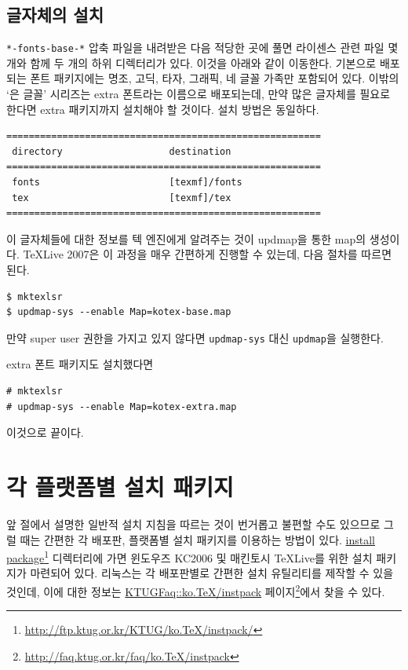 \subsection{글자체의 설치}

\texttt{*-fonts-base-*} 압축 파일을 내려받은 다음 적당한 곳에 풀면
라이센스 관련 파일 몇 개와 함께 두 개의 하위 디렉터리가 있다. 이것을
아래와 같이 이동한다.
기본으로 배포되는 폰트 패키지에는 명조, 고딕, 타자, 그래픽, 네 글꼴 가족만
포함되어 있다. 이밖의 `은 글꼴' 시리즈는 extra 폰트라는 이름으로 배포되는데,
만약 많은 글자체를 필요로 한다면 extra 패키지까지 설치해야 할 것이다.
설치 방법은 동일하다. 
\begin{verbatim}
========================================================
 directory                   destination
========================================================
 fonts                       [texmf]/fonts
 tex                         [texmf]/tex
========================================================
\end{verbatim}

이 글자체들에 대한 정보를 텍 엔진에게 알려주는 것이 updmap을 통한
map의 생성이다. \TeX{}Live 2007은 이 과정을 매우 간편하게 진행할
수 있는데, 다음 절차를 따르면 된다.
\begin{verbatim}
$ mktexlsr
$ updmap-sys --enable Map=kotex-base.map
\end{verbatim}
만약 super user 권한을 가지고 있지 않다면 \texttt{updmap-sys} 대신
\texttt{updmap}을 실행한다. 

extra 폰트 패키지도 설치했다면
\begin{verbatim}
# mktexlsr
# updmap-sys --enable Map=kotex-extra.map
\end{verbatim}
이것으로 끝이다.

\section{각 플랫폼별 설치 패키지}

앞 절에서 설명한 일반적 설치 지침을 따르는 것이 번거롭고 불편할 수도 
있으므로 그럴 때는 간편한 각 배포판, 플랫폼별 설치 패키지를 이용하는
방법이 있다. \href{http://ftp.ktug.or.kr/KTUG/ko.TeX/instpack/}{install
package}\footnote{\url{http://ftp.ktug.or.kr/KTUG/ko.TeX/instpack/}} 디렉터리에 가면 윈도우즈 KC2006 및 매킨토시 \TeX{}Live를 위한
설치 패키지가 마련되어 있다. 리눅스는 각 배포판별로 간편한 설치
유틸리티를 제작할 수 있을 것인데, 이에 대한 정보는 \href{http://faq.ktug.or.kr/faq/ko.TeX/instpack}{KTUGFaq::ko.TeX/instpack} 페이지\footnote{\url{http://faq.ktug.or.kr/faq/ko.TeX/instpack}}에서
찾을 수 있다.

